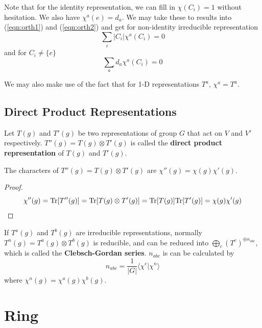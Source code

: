 \documentclass[12pt]{book}
\begin{document}
	Note that for the identity representation, we can fill in $\chi(C_i)=1$ without hesitation. We also have $\chi^a(e)=d_a$. We may take these to results into (\ref{eqn:orth1}) and (\ref{eqn:orth2}) and get for non-identity irreducible representation
	\begin{equation}
		\sum_i|C_i|\chi^a(C_i)=0
	\end{equation}
	and for $C_i\neq\{e\}$
	\begin{equation}
		\sum_ad_a\chi^a(C_i)=0
	\end{equation}
	
	We may also make use of the fact that for 1-D representations $T^a$, $\chi^a=T^a$.
	\section{Direct Product Representations}
	\begin{definition}
	Let $T(g)$ and $T'(g)$ be two representations of group $G$ that act on $V$ and $V'$ respectively. $T''(g)=T(g)\otimes T'(g)$ is called the\textbf{ direct product representation} of $T(g)$ and $T'(g)$.
	\end{definition}

	\begin{lemma}
	The characters of $T''(g)=T(g)\otimes T'(g)$ are $\chi''(g)=\chi(g)\chi'(g)$.
	\end{lemma}
	\begin{proof}
			\begin{equation}
		\chi''(g)={\rm Tr}[T''(g)]={\rm Tr}[T(g)\otimes T'(g)]={\rm Tr}[T(g)]{\rm Tr}[ T'(g)]=\chi(g)\chi'(g)
	\end{equation}
	\end{proof}
	
	\begin{definition}
	If $T^a(g)$ and $T^b(g)$ are irreducible representations, normally $T^n(g)=T^a(g)\otimes T^b(g)$ is reducible, and can be reduced into $\bigoplus_c(T^c)^{\oplus n_{abc}}$, which is called the\textbf{ Clebsch-Gordan series}. $n_{abc}$ is can be calculated by
	\begin{equation}
		n_{abc}=\frac 1{|G|}\langle \chi^c|\chi^n\rangle
	\end{equation}
	where $\chi^n(g)=\chi^a(g)\chi^b(g)$.	
	\end{definition}
	
\chapter{Ring}
\end{document}
